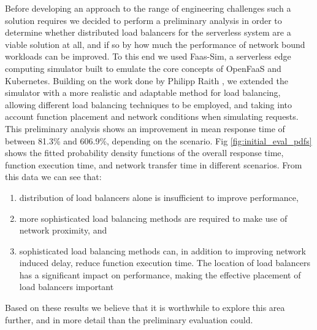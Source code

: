 Before developing an approach to the range of engineering challenges such a solution requires we decided to perform a preliminary analysis in order to determine whether distributed load balancers for the serverless system are a viable solution at all, and if so by how much the performance of network bound workloads can be improved.
To this end we used Faas-Sim\cite{faas-sim-github},
a serverless edge computing simulator built to emulate the core concepts of OpenFaaS and Kubernetes. Building on the work done by Philipp Raith \cite{philipp-da},
we extended the simulator with a more realistic and adaptable method for load balancing, allowing different load balancing techniques to be employed, and taking into account function placement and network conditions when simulating requests.%
This preliminary analysis shows an improvement in mean response time of between 81.3\% and 606.9\%, depending on the scenario. Fig \ref{fig:initial_eval_pdfs}
shows the fitted probability density functions of the overall response time, function execution time, and network transfer time in different scenarios. From this data we can see that:
\begin{enumerate}
    \item distribution of load balancers alone is insufficient to improve performance,
    \item more sophisticated load balancing methods are required to make use of network proximity, and
    \item sophisticated load balancing methods can, in addition to improving network induced delay, reduce function execution time.
    \iitem The location of load balancers has a significant impact on performance, making the effective placement of load balancers important
\end{enumerate}
Based on these results we believe that it is worthwhile to explore this area further, and in more detail than the preliminary evaluation could.

